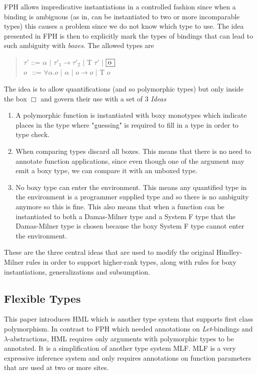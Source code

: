 \documentclass[12pt, a4paper, oneside]{article}
\begin{document}
FPH allows impredicative instantiations in a controlled fashion since when a binding is ambiguous (as in, can be instantiated to two or more incomparable types) this causes a problem since we do not know which type to use. The idea presented in FPH is then to explicitly mark the types of bindings that can lead to such ambiguity with \textit{boxes}. The allowed types are

\begin{quotation}
$\tau'$ ::= $\alpha$ $|$  $\tau'_1 \rightarrow \tau'_2$ $|$ T $\tau'$ $|$ $\framebox[0.45cm][l]{o}$ \\
\indent $o$ $\hspace{1pt}$ ::= $\forall \alpha.o$ $|$ $\alpha$ $|$ $o \rightarrow o$ $|$ T $o$
\end{quotation}

The idea is to allow quantifications (and so polymorphic types) but only inside the box $\Box$ and govern their use with a set of 3 \textit{Ideas}\cite{FPH}

\begin{enumerate}
\item A polymorphic function is instantiated with boxy monotypes which indicate places in the type where "guessing" is required to fill in a type in order to type check.
\item When comparing types discard all boxes. This means that there is no need to annotate function applications, since even though one of the argument may emit a boxy type, we can compare it with an unboxed type.
\item No boxy type can enter the environment. This means any quantified type in the environment is a programmer supplied type and so there is no ambiguity anymore so this is fine. This also means that when a function can be instantiated to both a Damas-Milner type and a System F type that the Damas-Milner type is chosen because the boxy System F type cannot enter the environment.
\end{enumerate}

These are the three central ideas that are used to modify the original Hindley-Milner rules in order to support higher-rank types, along with rules for boxy instantiations, generalizations and subsumption.

\subsection{Flexible Types\cite{HML}}
This paper introduces HML which is another type system that supports first class polymorphism. In contrast to FPH which needed annotations on \textit{Let}-bindings and $\lambda$-abstractions, HML requires only arguments with polymorphic types to be annotated. It is a simplification of another type system MLF. MLF is a very expressive inference system and only requires annotations on function parameters that are used at two or more sites.
\end{document}
